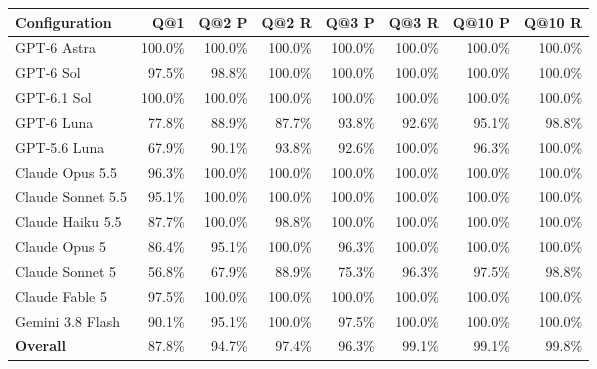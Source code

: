 \begin{tabular}{lrrrrrrr}
\toprule
Configuration & Q@1 & Q@2 P & Q@2 R & Q@3 P & Q@3 R & Q@10 P & Q@10 R \\
\midrule
GPT-6 Astra & 100.0\% & 100.0\% & 100.0\% & 100.0\% & 100.0\% & 100.0\% & 100.0\% \\
GPT-6 Sol & 97.5\% & 98.8\% & 100.0\% & 100.0\% & 100.0\% & 100.0\% & 100.0\% \\
GPT-6.1 Sol & 100.0\% & 100.0\% & 100.0\% & 100.0\% & 100.0\% & 100.0\% & 100.0\% \\
GPT-6 Luna & 77.8\% & 88.9\% & 87.7\% & 93.8\% & 92.6\% & 95.1\% & 98.8\% \\
GPT-5.6 Luna & 67.9\% & 90.1\% & 93.8\% & 92.6\% & 100.0\% & 96.3\% & 100.0\% \\
Claude Opus 5.5 & 96.3\% & 100.0\% & 100.0\% & 100.0\% & 100.0\% & 100.0\% & 100.0\% \\
Claude Sonnet 5.5 & 95.1\% & 100.0\% & 100.0\% & 100.0\% & 100.0\% & 100.0\% & 100.0\% \\
Claude Haiku 5.5 & 87.7\% & 100.0\% & 98.8\% & 100.0\% & 100.0\% & 100.0\% & 100.0\% \\
Claude Opus 5 & 86.4\% & 95.1\% & 100.0\% & 96.3\% & 100.0\% & 100.0\% & 100.0\% \\
Claude Sonnet 5 & 56.8\% & 67.9\% & 88.9\% & 75.3\% & 96.3\% & 97.5\% & 98.8\% \\
Claude Fable 5 & 97.5\% & 100.0\% & 100.0\% & 100.0\% & 100.0\% & 100.0\% & 100.0\% \\
Gemini 3.8 Flash & 90.1\% & 95.1\% & 100.0\% & 97.5\% & 100.0\% & 100.0\% & 100.0\% \\
\textbf{Overall} & 87.8\% & 94.7\% & 97.4\% & 96.3\% & 99.1\% & 99.1\% & 99.8\% \\
\bottomrule
\end{tabular}
